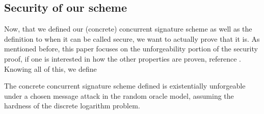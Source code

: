 \subsection{Security of our scheme}\label{concretesec}
  Now, that we defined our (concrete) concurrent signature scheme as well as the definition to when it can be called secure, we want to actually prove that it is.
  As mentioned before, this paper focuses on the unforgeability portion of the security proof, if one is interested in how the other properties are proven, reference \cite{chen2004concurrent}.\\
  Knowing all of this, we define
  \begin{lemma}\label{unforgeablelemma}
    The concrete concurrent signature scheme defined is existentially unforgeable under a chosen message attack in the random oracle model, assuming the hardness of the discrete logarithm problem.
  \end{lemma}